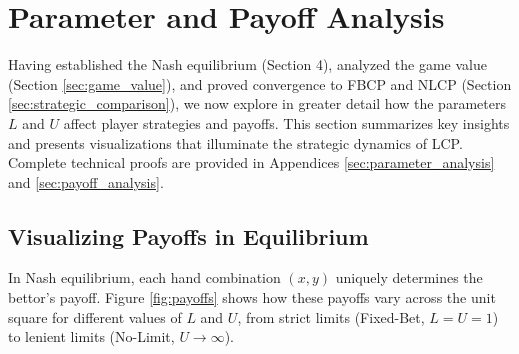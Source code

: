 \documentclass[../../main/main.tex]{subfiles}
\begin{document}
\section{Parameter and Payoff Analysis}

Having established the Nash equilibrium (Section 4), analyzed the game value (Section \ref{sec:game_value}), and proved convergence to FBCP and NLCP (Section \ref{sec:strategic_comparison}), we now explore in greater detail how the parameters $L$ and $U$ affect player strategies and payoffs. This section summarizes key insights and presents visualizations that illuminate the strategic dynamics of LCP. Complete technical proofs are provided in Appendices \ref{sec:parameter_analysis} and \ref{sec:payoff_analysis}.

\subsection{Visualizing Payoffs in Equilibrium}

In Nash equilibrium, each hand combination $(x, y)$ uniquely determines the bettor's payoff. Figure \ref{fig:payoffs} shows how these payoffs vary across the unit square for different values of $L$ and $U$, from strict limits (Fixed-Bet, $L=U=1$) to lenient limits (No-Limit, $U \to \infty$).
\end{document}
